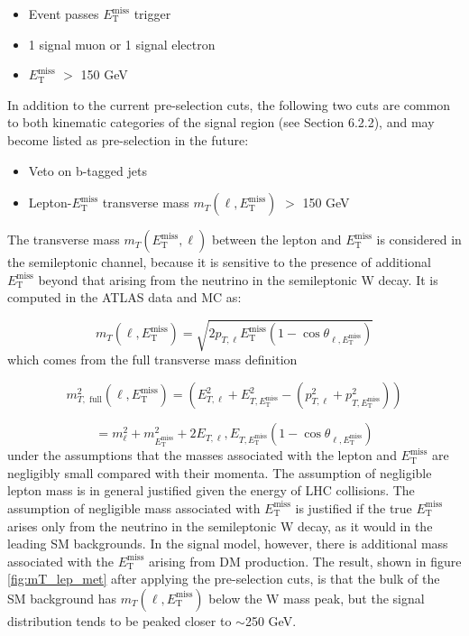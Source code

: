 \documentclass[12pt]{article}
\newcommand*{\met}{\ensuremath{E_\text{T}^\text{miss}} }
\begin{document}
\begin{itemize}
\item Event passes \met trigger
\item 1 signal muon or 1 signal electron
\item \met $>$ 150 GeV
\end{itemize}

In addition to the current pre-selection cuts, the following two cuts are common to both kinematic categories of the signal region (see Section 6.2.2), and may become listed as pre-selection in the future:

\begin{itemize}
\item Veto on b-tagged jets
\item Lepton-\met transverse mass $m_T(\ell, \met)$ $>$ 150 GeV
\end{itemize}

The transverse mass $m_T(\met, \ell)$ between the lepton and \met is considered in the semileptonic channel, because it is sensitive to the presence of additional \met beyond that arising from the neutrino in the semileptonic W decay. It is computed in the ATLAS data and MC as:

\begin{equation}
m_T(\ell, \met) = \sqrt{2p_{T, \ell} \met(1-\cos\theta_{\ell, \met})}
\end{equation}
which comes from the full transverse mass definition \cite{PDG_kin}

\begin{equation}
m_{T, \text{ full}}^2(\ell, \met) = (E_{T, \ell}^2 + E_{T, \met}^2 - (p_{T, \ell}^2 + p_{T, \met}^2)) 
\end{equation}

$$
= m_\ell^2+m_{\met}^2 + 2E_{T, \ell}, E_{T, \met}(1-\cos\theta_{\ell, \met})
$$
under the assumptions that the masses associated with the lepton and \met are negligibly small compared with their momenta. The assumption of negligible lepton mass is in general justified given the energy of LHC collisions. The assumption of negligible mass associated with \met is justified if the true \met arises only from the neutrino in the semileptonic W decay, as it would in the leading SM backgrounds. In the signal model, however, there is additional mass associated with the \met arising from DM production. The result, shown in figure \ref{fig:mT_lep_met} after applying the pre-selection cuts, is that the bulk of the SM background has $m_T(\ell, \met)$ below the W mass peak, but the signal distribution tends to be peaked closer to $\sim$250 GeV. 
\end{document}
